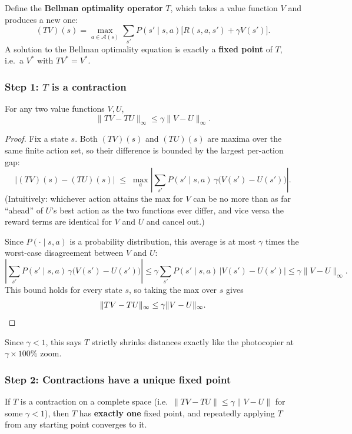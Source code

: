 \documentclass{scrartcl}
\theoremstyle{mytheoremstyle}
\theoremstyle{mytheoremstyle}
\theoremstyle{myproblemstyle}
\begin{document}
Define the \textbf{Bellman optimality operator} $T$, which takes a value function $V$ and produces a
new one:
\[
    (TV)(s) = \max_{a \in \mathcal{A}(s)} \sum_{s'} P(s'\mid s,a)\big[R(s,a,s') + \gamma V(s')\big].
\]
A solution to the Bellman optimality equation is exactly a \textbf{fixed point} of $T$, i.e.\ a $V^*$
with $TV^* = V^*$.

\subsubsection*{Step 1: $T$ is a contraction}

\begin{theorem}
    For any two value functions $V, U$,
    \[
        \|TV - TU\|_\infty \le \gamma \|V - U\|_\infty .
    \]
\end{theorem}

\begin{proof}
    Fix a state $s$. Both $(TV)(s)$ and $(TU)(s)$ are maxima over the same finite action set, so their
    difference is bounded by the largest per-action gap:
    \[
        |(TV)(s) - (TU)(s)| \;\le\; \max_{a} \left| \sum_{s'} P(s'\mid s,a)\,\gamma\big(V(s')-U(s')\big) \right|.
    \]
    (Intuitively: whichever action attains the max for $V$ can be no more than as far ``ahead'' of $U$'s
    best action as the two functions ever differ, and vice versa the reward terms are identical for $V$
    and $U$ and cancel out.)

    Since $P(\cdot \mid s,a)$ is a probability distribution, this average is at most $\gamma$ times the
    worst-case disagreement between $V$ and $U$:
    \[
        \left|\sum_{s'} P(s'\mid s,a)\,\gamma\big(V(s')-U(s')\big)\right|
        \le \gamma \sum_{s'} P(s'\mid s,a)\,|V(s')-U(s')|
        \le \gamma \|V-U\|_\infty .
    \]
    This bound holds for every state $s$, so taking the max over $s$ gives
    \[
        \|TV - TU\|_\infty \le \gamma\|V-U\|_\infty. \qedhere
    \]
\end{proof}

Since $\gamma < 1$, this says $T$ strictly shrinks distances exactly like the photocopier at
$\gamma \times 100\%$ zoom.

\subsubsection*{Step 2: Contractions have a unique fixed point}

\begin{theorem}
    If $T$ is a contraction on a complete space (i.e.\ $\|TV-TU\| \le \gamma \|V-U\|$ for some
    $\gamma < 1$), then $T$ has \textbf{exactly one} fixed point, and repeatedly applying $T$ from any
    starting point converges to it.
\end{theorem}
\end{document}
